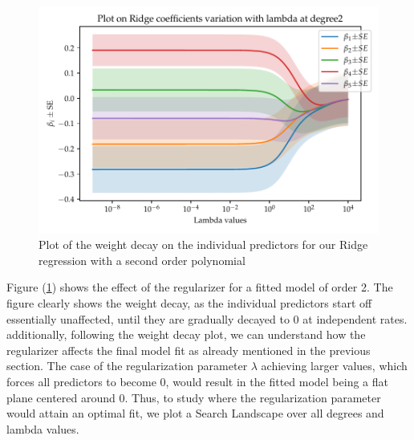 \documentclass[11pt, a4paper]{article}
\begin{document}
\begin{figure}
  \centering
  \includegraphics[scale=0.75]{figures/EX4_beta_plot_ridge_2.pdf}
  \caption{\label{fig:ridge_beta_1}Plot of the weight decay on the individual predictors for our Ridge regression with a second order polynomial}
\end{figure}

Figure (\ref{fig:ridge_beta_1}) shows the effect of the regularizer for a fitted model of order 2. The figure clearly shows the weight decay, as the individual predictors start off essentially unaffected, until they are gradually decayed to 0 at independent rates. additionally, following the weight decay plot, we can understand how the regularizer affects the final model fit as already mentioned in the previous section. The case of the regularization parameter $\lambda$ achieving larger values, which forces all predictors to become 0, would result in the fitted model being a flat plane centered around 0. Thus, to study where the regularization parameter would attain an optimal fit, we plot a Search Landscape over all degrees and lambda values.
\end{document}
